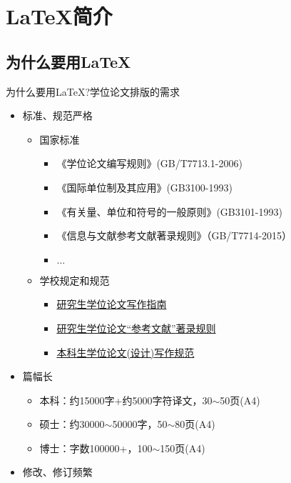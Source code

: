 \section[\LaTeX 简介]{\LaTeX 简介}
\subsection[为什么？]{为什么要用\LaTeX{}}
\begin{frame}{为什么要用\LaTeX?}{学位论文排版的需求}
  \begin{spacing}{0.85}
  \begin{itemize}%
  \item 标准、规范\alert{严格}
    \begin{itemize}
    \item \alert{国家}标准
      \begin{itemize}
      \item 《学位论文编写规则》(GB/T7713.1-2006)
      \item 《国际单位制及其应用》(GB3100-1993)
      \item 《有关量、单位和符号的一般原则》(GB3101-1993)
      \item 《信息与文献参考文献著录规则》（GB/T7714-2015）
      \item $\ldots$
      \end{itemize}
    \item \alert{学校}规定和规范
      \begin{itemize}
      \item \href{https://yjshy.nwafu.edu.cn/xwgl/xwlwxzgf/index.htm}{研究生学位论文\alert{写作指南}}
      \item \href{https://yjshy.nwafu.edu.cn/xwgl/xwlwxzgf/127000.htm}{研究生学位论文\enquote{参考文献}\alert{著录规则}}
      \item \href{https://jiaowu.nwsuaf.edu.cn/tzgg/34321.htm}{本科生学位论文(设计)\alert{写作规范}}      
      \end{itemize}
    \end{itemize}
  \item 篇幅\alert{长}
    \begin{itemize}
    \item 本科：约15000字+约5000字符译文，30$\sim$50页(A4)
    \item 硕士：约30000$\sim$50000字，50$\sim$80页(A4)
    \item 博士：字数100000+，100$\sim$150页(A4)
    \end{itemize}  
  \item 修改、修订\alert{频繁}

\end{itemize}
\end{spacing}
\end{frame}

